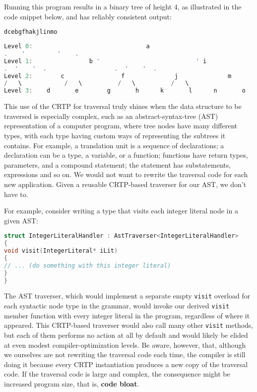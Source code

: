 \noindent Running this program results in a binary tree of height 4, as
illustrated in the code snippet below, and has reliably consistent output:

\begin{lstlisting}[language=C++]
dcebgfhakjlinmo
\end{lstlisting}

\begin{lstlisting}[language=C++]
Level 0:                                a
.    '         '    .
Level 1:                b '                           ' i
.  '    '  .                   .  '    '  .
Level 2:        c                f              j              m
/   \            /   \          /   \          /   \
Level 3:    d       e        g       h      k       l      n       o
\end{lstlisting}

\noindent This use of the CRTP for traversal truly shines when the data structure to
be traversed is especially complex, such as an abstract-syntax-tree
(AST) representation of a computer program, where tree nodes have many
different types, with each type having custom ways of representing the
subtrees it contains. For example, a translation unit is a sequence of
declarations; a declaration can be a type, a variable, or a function;
functions have return types, parameters, and a compound statement; the
statement has substatements, expressions and so on. We would not want
to rewrite the traversal code for each new application. Given a reusable
CRTP-based traverser for our AST, we don't have to.

For example, consider writing a type that visits each integer literal
node in a given AST:

\begin{lstlisting}[language=C++]
struct IntegerLiteralHandler : AstTraverser<IntegerLiteralHandler>
{
void visit(IntegerLiteral* iLit)
{
// ... (do something with this integer literal)
}
}
\end{lstlisting}

\noindent The AST traverser, which would implement a separate empty \texttt{visit}
overload for each syntactic node type in the grammar, would invoke our
derived \texttt{visit} member function with every integer literal in the
program, regardless of where it appeared. This CRTP-based traverser
would also call many other \texttt{visit} methods, but each of them performs no action at all by default and would likely be elided at even modest compiler-optimization levels. Be aware, however, that, although we ourselves are
not rewriting the traversal code each time, the compiler is still doing
it because every CRTP instantiation produces a new copy of the traversal
code. If the traversal code is large and complex, the consequence might
be increased program size, that is, \textbf{code bloat}.

